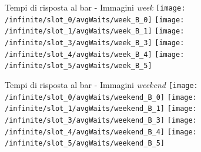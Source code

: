 \documentclass[xcolor=table]{beamer}
\begin{document}
\begin{frame}{Tempi di risposta al bar - Immagini \textit{week}}\justifying
\centering
\texttt{[image: /infinite/slot\_0/avgWaits/week\_B\_0]}
\texttt{[image: /infinite/slot\_1/avgWaits/week\_B\_1]}
\texttt{[image: /infinite/slot\_3/avgWaits/week\_B\_3]}
\texttt{[image: /infinite/slot\_4/avgWaits/week\_B\_4]}
\texttt{[image: /infinite/slot\_5/avgWaits/week\_B\_5]}
\end{frame}

\begin{frame}{Tempi di risposta al bar - Immagini \textit{weekend}}\justifying
\centering
\texttt{[image: /infinite/slot\_0/avgWaits/weekend\_B\_0]}
\texttt{[image: /infinite/slot\_1/avgWaits/weekend\_B\_1]}
\texttt{[image: /infinite/slot\_3/avgWaits/weekend\_B\_3]}
\texttt{[image: /infinite/slot\_4/avgWaits/weekend\_B\_4]}
\texttt{[image: /infinite/slot\_5/avgWaits/weekend\_B\_5]}
\end{frame}
\end{document}
